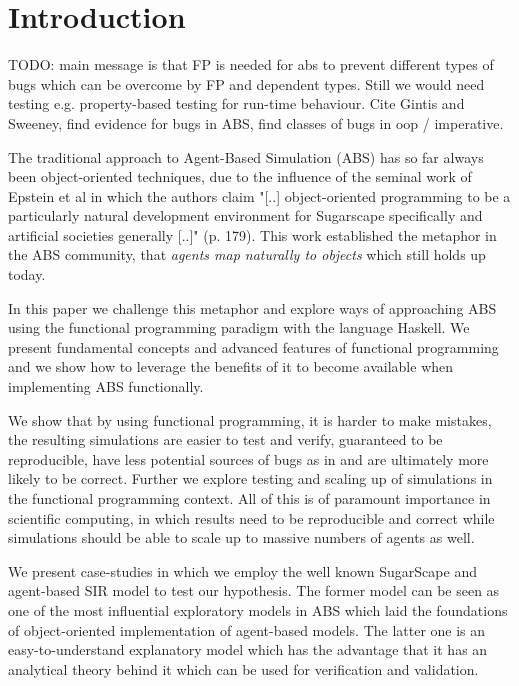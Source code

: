 \section{Introduction}
TODO: main message is that FP is needed for abs to prevent different types of bugs which can be overcome by FP and dependent types. Still we would need testing e.g. property-based testing for run-time behaviour. Cite Gintis and Sweeney, find evidence for bugs in ABS, find classes of bugs in oop / imperative.

The traditional approach to Agent-Based Simulation (ABS) has so far always been object-oriented techniques, due to the influence of the seminal work of Epstein et al \cite{epstein_growing_1996} in which the authors claim "[..] object-oriented programming to be a particularly natural development environment for Sugarscape specifically and artificial societies generally [..]" (p. 179). This work established the metaphor in the ABS community, that \textit{agents map naturally to objects} \citep{north_managing_2007} which still holds up today.

In this paper we challenge this metaphor and explore ways of approaching ABS using the functional programming paradigm with the language Haskell. We present fundamental concepts and advanced features of functional programming and we show how to leverage the benefits of it \citep{hudak_history_2007} to become available when implementing ABS functionally.

We show that by using functional programming, it is harder to make mistakes, the resulting simulations are easier to test and verify, guaranteed to be reproducible, have less potential sources of bugs as in \citep{vipindeep_list_2005} and are ultimately more likely to be correct. Further we explore testing and scaling up of simulations in the functional programming context. All of this is of paramount importance in scientific computing, in which results need to be reproducible and correct while simulations should be able to scale up to massive numbers of agents as well. 

We present case-studies in which we employ the well known SugarScape \citep{epstein_growing_1996} and agent-based SIR \citep{macal_agent-based_2010} model to test our hypothesis. The former model can be seen as one of the most influential exploratory models in ABS which laid the foundations of object-oriented implementation of agent-based models. The latter one is an easy-to-understand explanatory model which has the advantage that it has an analytical theory behind it which can be used for verification and validation.

